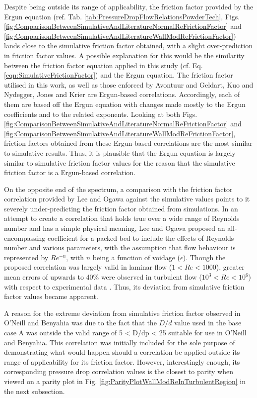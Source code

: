 Despite being outside its range of applicability, the friction factor provided by the Ergun equation (ref. Tab. \ref{tab:PressureDropFlowRelationsPowderTech}, Figs. \ref{fig:ComparisonBetweenSimulativeAndLiteratureNormalReFrictionFactor} and \ref{fig:ComparisonBetweenSimulativeAndLiteratureWallModReFrictionFactor}) lands close to the simulative friction factor obtained, with a slight over-prediction in friction factor values. A possible explanation for this would be the similarity between the friction factor equation applied in this study (cf. Eq. \ref{eqn:SimulativeFrictionFactor}) and the Ergun equation. The friction factor utilised in this work, as well as those enforced by Avontuur and Geldart, Kuo and Nydegger, Jones and Krier are Ergun-based correlations. Accordingly, each of them are based off the Ergun equation with changes made mostly to the Ergun coefficients and to the related exponents. Looking at both Figs. \ref{fig:ComparisonBetweenSimulativeAndLiteratureNormalReFrictionFactor} and \ref{fig:ComparisonBetweenSimulativeAndLiteratureWallModReFrictionFactor}, friction factors obtained from these Ergun-based correlations are the most similar to simulative results.
Thus, it is plausible that the Ergun equation is largely similar to simulative friction factor values for the reason that the simulative friction factor is a Ergun-based correlation.

On the opposite end of the spectrum, a comparison with the friction factor correlation provided by Lee and Ogawa against the simulative values points to it severely under-predicting the friction factor obtained from simulations. In an attempt to create a correlation that holds true over a wide range of Reynolds number and has a simple physical meaning, Lee and Ogawa \cite{Lee1994} proposed an all-encompassing coefficient for a packed bed to include the effects of Reynolds number and various parameters, with the assumption that flow behaviour is represented by $Re^{-n}$, with $n$ being a function of voidage ($\epsilon$). Though the proposed correlation was largely valid in laminar flow ($1 < Re < 1000$), greater mean errors of upwards to 40\% were observed in turbulent flow ($10^3 < Re < 10^6$) with respect to experimental data \cite{Lee1994}. Thus, its deviation from simulative friction factor values became apparent.

A reason for the extreme deviation from simulative friction factor observed in O'Neill and Benyahia was due to the fact that the $D/d$ value used in the base case A was outside the valid range of 5 < D/dp < 25 suitable for use in O'Neill and Benyahia. This correlation was initially included for the sole purpose of demonstrating what would happen should a correlation be applied outside its range of applicability for its friction factor. However, interestingly enough, its corresponding pressure drop correlation values is the closest to parity when viewed on a parity plot in Fig. \ref{fig:ParityPlotWallModReInTurbulentRegion} in the next subsection.

